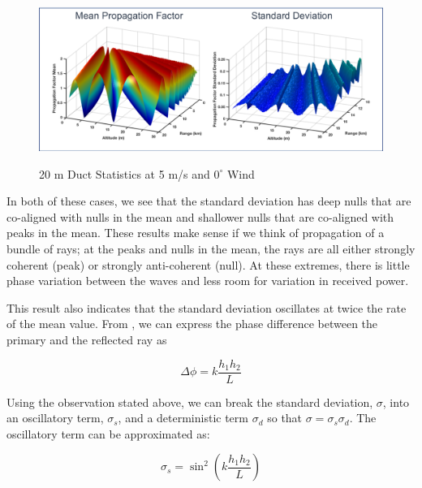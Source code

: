 \begin{figure}[H]
  \begin{center}
\includegraphics[width=5.5in]{../media/multistatic/duct_results.png}
  \end{center}
  \renewcommand{\baselinestretch}{1} \small\normalsize
  \begin{quote}
    \caption[20 m Duct Statistics at 5 m/s and $0^{\circ}$ Wind]{20 m Duct Statistics at 5 m/s and $0^{\circ}$ Wind\label{stat_fig:1zzz}}
  \end{quote}
\end{figure}
\renewcommand{\baselinestretch}{2} \small\normalsize

In both of these cases, we see that the standard deviation has deep nulls that are co-aligned with nulls in the mean and shallower nulls that are co-aligned with peaks in the mean. These results make sense if we think of propagation of a bundle of rays; at the peaks and nulls in the mean, the rays are all either strongly coherent (peak) or strongly anti-coherent (null). At these extremes, there is little phase variation between the waves and less room for variation in received power. 

This result also indicates that the standard deviation oscillates at twice the rate of the mean value. From \cite{frazier_green}, we can express the phase difference between the primary and the reflected ray as

\begin{equation}
\Delta\phi = k\frac{h_1h_2}{L}
\end{equation}
\renewcommand{\baselinestretch}{2} \small\normalsize

Using the observation stated above, we can break the standard deviation, $\sigma$, into an oscillatory term, $\sigma_s$, and a deterministic term $\sigma_d$ so that $\sigma = \sigma_s \sigma_d$. The oscillatory term can be approximated as:

\begin{equation}
\sigma_s = \sin^2\left(k\frac{h_1h_2}{L}\right)
\end{equation}
\renewcommand{\baselinestretch}{2} \small\normalsize

